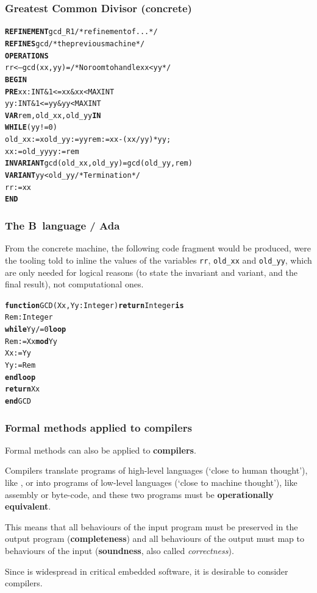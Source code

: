 \documentclass[compress,dvipdfmx]{beamer}
\begin{document}
\begin{frame}[fragile]
  \frametitle{Greatest Common Divisor (concrete)}

\begin{alltt}
\small
\textbf{REFINEMENT} gcd_R1 /* refinement of ... */
\textbf{REFINES} gcd /* the previous machine */
\textbf{OPERATIONS}
 rr <-- gcd (xx,yy) = /* No room to handle xx < yy */
   \textbf{BEGIN}
     \textbf{PRE} xx : INT \& 1 <= xx \& xx < MAXINT
         yy : INT \& 1 <= yy \& yy < MAXINT
     \textbf{VAR} rem, old_xx, old_yy \textbf{IN}
     \textbf{WHILE} (yy != 0)
       old_xx := xold_yy := yyrem := xx-(xx/yy)*yy;
       xx := old_yyyy := rem
     \textbf{INVARIANT} gcd (old_xx, old_yy) = gcd (old_yy, rem)
     \textbf{VARIANT} yy < old_yy /* Termination */
     rr := xx
   \textbf{END}
\end{alltt}

\end{frame}

\begin{frame}[fragile]
  \frametitle{The B~language / Ada}

  From the concrete machine, the following \Ada code fragment would be
  produced, were the tooling told to inline the values of the
  variables \texttt{\small rr}, \texttt{\small old\_xx} and
  \texttt{\small old\_yy}, which are only needed for logical reasons
  (to state the invariant and variant, and the final result), not
  computational ones.
\begin{alltt}
\small
\textbf{function} GCD (Xx, Yy : Integer) \textbf{return} Integer \textbf{is}
  Rem : Integer
  \textbf{while} Yy /= 0 \textbf{loop}
    Rem := Xx \textbf{mod} Yy
    Xx := Yy
    Yy := Rem
  \textbf{end loop}
  \textbf{return} Xx
\textbf{end} GCD
\end{alltt}

\end{frame}


\begin{frame}
  \frametitle{Formal methods applied to compilers}

  Formal methods can also be applied to \textbf{compilers}.

  \bigskip

  Compilers translate programs of high\hyp{}level languages (`close to
  human thought'), like \Clang, \Ada or \OCaml into programs of
  low\hyp{}level languages (`close to machine thought'), like assembly
  or byte\hyp{}code, and these two programs must be
  \textbf{operationally equivalent}.

  \bigskip

  This means that all behaviours of the input program must be
  preserved in the output program (\textbf{completeness}) and all
  behaviours of the output must map to behaviours of the input
  (\textbf{soundness}, also called \emph{correctness}).

  \bigskip

  Since \Clang is widespread in critical embedded software, it is
  desirable to consider \Clang compilers.

\end{frame}
\end{document}
